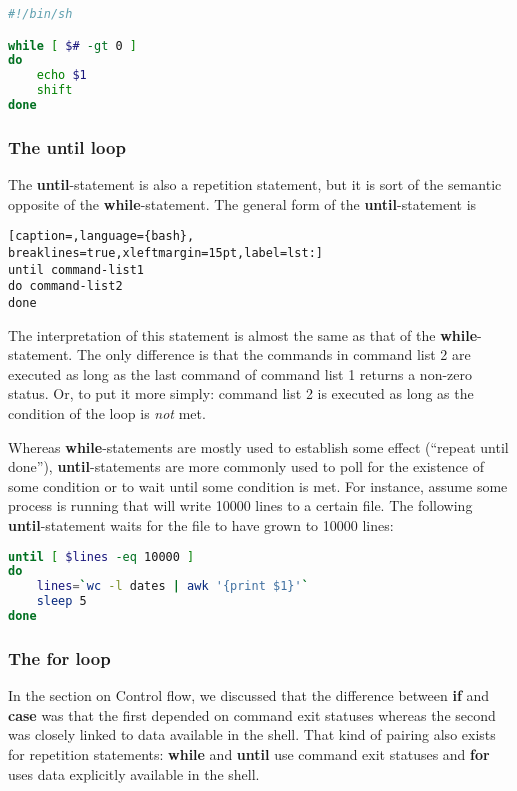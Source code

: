 \lstset{basicstyle=\scriptsize, numbers=left, captionpos=b, tabsize=4}
\begin{lstlisting}[caption=Printing all the command-line arguments,language={bash},
breaklines=true,xleftmargin=15pt,label=lst:Printing all the command-line arguments]
#!/bin/sh

while [ $# -gt 0 ]
do
    echo $1
    shift
done
\end{lstlisting}

\subsubsection{The until loop}
The \textbf{until}-statement is also a repetition statement, but it is sort of
the semantic opposite of the \textbf{while}-statement. The general form of the
\textbf{until}-statement is

\lstset{basicstyle=\scriptsize, numbers=left, captionpos=b, tabsize=4}
\begin{lstlisting}[caption=,language={bash},
breaklines=true,xleftmargin=15pt,label=lst:]
until command-list1
do command-list2
done
\end{lstlisting}

The interpretation of this statement is almost the same as that of the
\textbf{while}-statement. The only difference is that the commands in command
list 2 are executed as long as the last command of command list 1 returns a
non-zero status. Or, to put it more simply: command list 2 is executed as long
as the condition of the loop is \emph{not} met.

Whereas \textbf{while}-statements are mostly used to establish some effect
(``repeat until done''), \textbf{until}-statements are more commonly used to
poll for the existence of some condition or to wait until some condition is
met. For instance, assume some process is running that will write 10000 lines
to a certain file. The following \textbf{until}-statement waits for the file to
have grown to 10000 lines:

\lstset{basicstyle=\scriptsize, numbers=left, captionpos=b, tabsize=4}
\begin{lstlisting}[caption=Waiting for myfile.txt to grow to 10000 lines,language={bash},
breaklines=true,xleftmargin=15pt,label=lst:Waiting for myfile.txt to grow to 10000 lines]
until [ $lines -eq 10000 ]
do
    lines=`wc -l dates | awk '{print $1}'`
    sleep 5
done
\end{lstlisting}

\subsubsection{The for loop}
In the section on Control flow, we discussed that the difference between
\textbf{if} and \textbf{case} was that the first depended on command exit
statuses whereas the second was closely linked to data available in the shell.
That kind of pairing also exists for repetition statements: \textbf{while} and
\textbf{until} use command exit statuses and \textbf{for} uses data explicitly
available in the shell.

